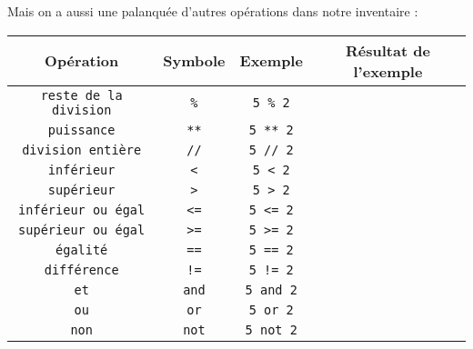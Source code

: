 \documentclass[12pt,a4paper, oneside]{article}
\begin{document}
      Mais on a aussi une palanquée d'autres opérations dans notre inventaire :
      \begin{center}
      \begin{tabular}{|c|c|c|c|}
        \hline
        \textbf{Opération} & \textbf{Symbole} & \textbf{Exemple} & \textbf{Résultat de l'exemple} \\
        \hline
         \texttt{reste de la division} & \texttt{\%} & \texttt{5 \% 2} & \\
        \hline
         \texttt{puissance} & \texttt{**} & \texttt{5 ** 2} & \\
        \hline
         \texttt{division entière} & \texttt{//} & \texttt{5 // 2} & \\
        \hline
         \texttt{inférieur} & \texttt{<} & \texttt{5 < 2} & \\
        \hline
         \texttt{supérieur} & \texttt{>} & \texttt{5 > 2} & \\
        \hline
         \texttt{inférieur ou égal} & \texttt{<=} & \texttt{5 <= 2} & \\
        \hline
         \texttt{supérieur ou égal} & \texttt{>=} & \texttt{5 >= 2} & \\
        \hline
         \texttt{égalité} & \texttt{==} & \texttt{5 == 2} & \\
        \hline
         \texttt{différence} & \texttt{!=} & \texttt{5 != 2} & \\
        \hline
         \texttt{et} & \texttt{and} & \texttt{5 and 2} & \\
        \hline
         \texttt{ou} & \texttt{or} & \texttt{5 or 2} & \\
        \hline
         \texttt{non} & \texttt{not} & \texttt{5 not 2} & \\
        \hline
      \end{tabular}
      \end{center}
\end{document}

